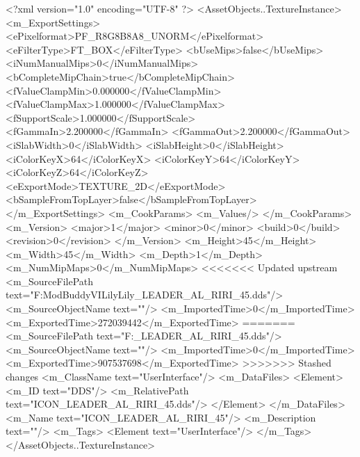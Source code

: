 <?xml version="1.0" encoding="UTF-8" ?>
<AssetObjects..TextureInstance>
	<m_ExportSettings>
		<ePixelformat>PF_R8G8B8A8_UNORM</ePixelformat>
		<eFilterType>FT_BOX</eFilterType>
		<bUseMips>false</bUseMips>
		<iNumManualMips>0</iNumManualMips>
		<bCompleteMipChain>true</bCompleteMipChain>
		<fValueClampMin>0.000000</fValueClampMin>
		<fValueClampMax>1.000000</fValueClampMax>
		<fSupportScale>1.000000</fSupportScale>
		<fGammaIn>2.200000</fGammaIn>
		<fGammaOut>2.200000</fGammaOut>
		<iSlabWidth>0</iSlabWidth>
		<iSlabHeight>0</iSlabHeight>
		<iColorKeyX>64</iColorKeyX>
		<iColorKeyY>64</iColorKeyY>
		<iColorKeyZ>64</iColorKeyZ>
		<eExportMode>TEXTURE_2D</eExportMode>
		<bSampleFromTopLayer>false</bSampleFromTopLayer>
	</m_ExportSettings>
	<m_CookParams>
		<m_Values/>
	</m_CookParams>
	<m_Version>
		<major>1</major>
		<minor>0</minor>
		<build>0</build>
		<revision>0</revision>
	</m_Version>
	<m_Height>45</m_Height>
	<m_Width>45</m_Width>
	<m_Depth>1</m_Depth>
	<m_NumMipMaps>0</m_NumMipMaps>
<<<<<<< Updated upstream
	<m_SourceFilePath text="F:\1\Firaxis ModBuddy\Civilization VI\Assault Lily\Assault Lily\Textures\ICON_LEADER_AL_RIRI_45.dds"/>
	<m_SourceObjectName text=""/>
	<m_ImportedTime>0</m_ImportedTime>
	<m_ExportedTime>272039442</m_ExportedTime>
=======
	<m_SourceFilePath text="F:\DT\lilyimages\all\ICON_LEADER_AL_RIRI_45.dds"/>
	<m_SourceObjectName text=""/>
	<m_ImportedTime>0</m_ImportedTime>
	<m_ExportedTime>907537698</m_ExportedTime>
>>>>>>> Stashed changes
	<m_ClassName text="UserInterface"/>
	<m_DataFiles>
		<Element>
			<m_ID text="DDS"/>
			<m_RelativePath text="ICON_LEADER_AL_RIRI_45.dds"/>
		</Element>
	</m_DataFiles>
	<m_Name text="ICON_LEADER_AL_RIRI_45"/>
	<m_Description text=""/>
	<m_Tags>
		<Element text="UserInterface"/>
	</m_Tags>
</AssetObjects..TextureInstance>

